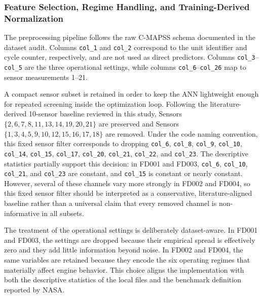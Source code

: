 \subsubsection{Feature Selection, Regime Handling, and Training-Derived Normalization}
The preprocessing pipeline follows the raw C-MAPSS schema documented in the dataset audit. Columns \texttt{col\_1} and \texttt{col\_2} correspond to the unit identifier and cycle counter, respectively, and are not used as direct predictors. Columns \texttt{col\_3}--\texttt{col\_5} are the three operational settings, while columns \texttt{col\_6}--\texttt{col\_26} map to sensor measurements 1--21.

A compact sensor subset is retained in order to keep the ANN lightweight enough for repeated screening inside the optimization loop. Following the literature-derived 10-sensor baseline reviewed in this study, Sensors $\{2,6,7,8,11,13,14,19,20,21\}$ are preserved and Sensors $\{1,3,4,5,9,10,12,15,16,17,18\}$ are removed. Under the code naming convention, this fixed sensor filter corresponds to dropping \texttt{col\_6}, \texttt{col\_8}, \texttt{col\_9}, \texttt{col\_10}, \texttt{col\_14}, \texttt{col\_15}, \texttt{col\_17}, \texttt{col\_20}, \texttt{col\_21}, \texttt{col\_22}, and \texttt{col\_23}. The descriptive statistics partially support this decision: in FD001 and FD003, \texttt{col\_6}, \texttt{col\_10}, \texttt{col\_21}, and \texttt{col\_23} are constant, and \texttt{col\_15} is constant or nearly constant. However, several of these channels vary more strongly in FD002 and FD004, so this fixed sensor filter should be interpreted as a conservative, literature-aligned baseline rather than a universal claim that every removed channel is non-informative in all subsets.

The treatment of the operational settings is deliberately dataset-aware. In FD001 and FD003, the settings are dropped because their empirical spread is effectively zero and they add little information beyond noise. In FD002 and FD004, the same variables are retained because they encode the six operating regimes that materially affect engine behavior. This choice aligns the implementation with both the descriptive statistics of the local files and the benchmark definition reported by NASA.

